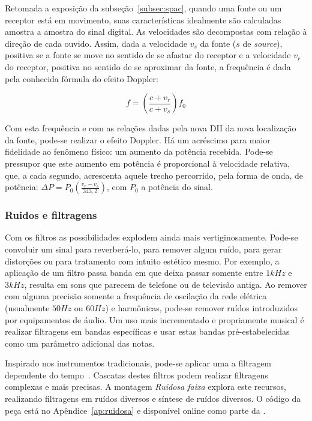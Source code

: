 Retomada a exposição da subseção~\ref{subsec:spac}, quando uma fonte ou um receptor está em movimento, suas características idealmente são calculadas amostra a amostra do sinal digital. As velocidades são decompostas com relação à direção de cada ouvido. Assim, dada a velocidade $v_s$ da fonte ($s$ de \emph{source}), positiva se a fonte se move no sentido de se afastar do receptor e a velocidade $v_r$ do receptor, positiva no sentido de se aproximar da fonte, a frequência é dada pela conhecida fórmula do efeito Doppler:

\begin{equation}
    f=\left(\frac{c+v_r}{c+v_s}\right)f_0
\end{equation}

Com esta frequência e com as relações dadas pela nova DII da nova localização da fonte, pode-se realizar o efeito Doppler. Há um acréscimo para maior fidelidade ao fenômeno físico: um aumento da potência recebida. Pode-se pressupor que este aumento em potência é proporcional à velocidade relativa, que, a cada segundo, acrescenta aquele trecho percorrido, pela forma de onda, de potência: $\Delta P=P_0\left(\frac{v_r-v_s}{343,2}\right)$, com $P_0$ a potência do sinal.

\subsubsection{Ruidos e filtragens}
Com os filtros as possibilidades explodem ainda mais vertiginosamente. Pode-se convoluir um sinal para reverberá-lo, para
remover algum ruído, para gerar distorções ou para tratamento com intuito estético mesmo. Por exemplo,
a aplicação de um filtro passa banda em que deixa passar somente entre $1kHz$ e $3kHz$, resulta em sons
que parecem de telefone ou de televisão antiga. Ao remover com alguma precisão somente
a frequência de oscilação da rede elétrica (usualmente $50Hz$ ou $60Hz$) e harmônicas, pode-se remover
ruídos introduzidos por equipamentos de áudio.
Um uso mais incrementado
e propriamente musical é realizar filtragens em bandas específicas e usar estas bandas
pré-estabelecidas como um parâmetro adicional das notas.

Inspirado nos instrumentos tradicionais, pode-se aplicar uma a filtragem dependente do tempo~\cite{Roederer}.
Cascatas
destes filtros podem realizar filtragens complexas e mais precisas. A montagem \emph{Ruidosa faixa} explora
este recursos, realizando filtragens em ruídos diversos e síntese de ruídos diversos. O código da peça está no Apêndice~\ref{ap:ruidosa} e disponível online como parte da \massa.

